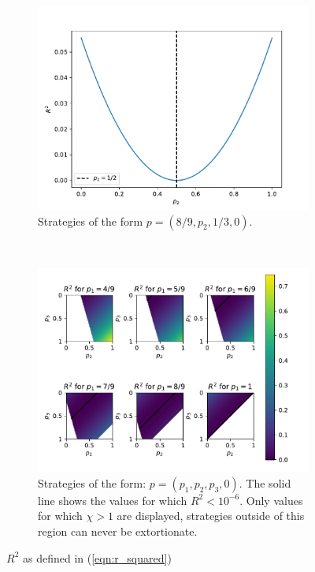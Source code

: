 \documentclass[a4paper]{article}
\begin{document}
\begin{figure}[!htbp]
    \centering
    \begin{subfigure}[t]{.4\textwidth}
        \centering
        \includegraphics[width=\textwidth]{assets/img/R_squared_for_varying_p2_for_extort2/main.pdf}
        \caption{Strategies of the form \(p=(8/9, p_2, 1/3, 0)\).}
        \label{fig:R_squared_for_varying_p2_for_extort2}
    \end{subfigure}%
    ~
    \begin{subfigure}[t]{.6\textwidth}
        \centering
        \includegraphics[width=\textwidth]{assets/img/examples_of_extortion/main.pdf}
        \caption{Strategies of the form:
                 \(p=(p_1, p_2, p_3, 0)\). The solid line shows the values for
                 which \(R^2 < 10 ^ {-6}\). Only values for which \(\chi > 1\) are
                 displayed, strategies outside of this region can never be
                 extortionate.}
        \label{fig:examples_of_extortion}
    \end{subfigure}
    \caption{\(R^2\) as defined in (\ref{eqn:r_squared})}
\end{figure}
\end{document}
